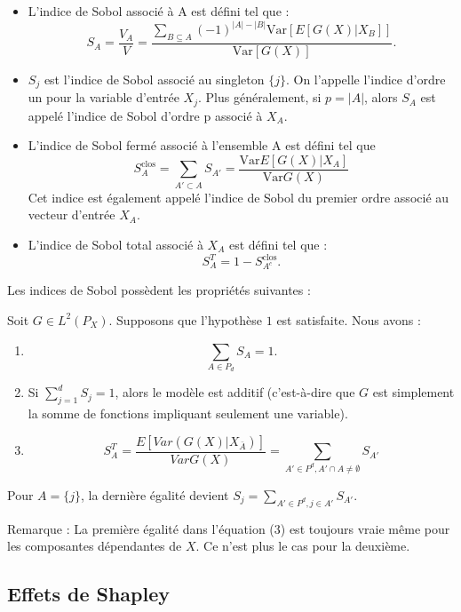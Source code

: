 \documentclass[
]{article}
\begin{document}
\begin{itemize}
\item
  L'indice de Sobol associé à A est défini tel que : \[
  S_A = \frac{V_A}{V} = \frac{\sum_{B \subseteq A} (-1)^{|A| - |B|} \text{Var} \left[E[G(X) | X_B]\right]}{\text{Var} [G(X)]}.
  \]
\item
  \(S_j\) est l'indice de Sobol associé au singleton \(\{j\}\). On
  l'appelle l'indice d'ordre un pour la variable d'entrée \(X_j\). Plus
  généralement, si \(p = |A|\), alors \(S_A\) est appelé l'indice de
  Sobol d'ordre p associé à \(X_A\).
\item
  L'indice de Sobol fermé associé à l'ensemble A est défini tel que
  \[ S^{\text{clos}}_A = \sum_{A'\subset A}S_{A'}=\frac{\text{Var} E[G(X)|X_A]}{\text{Var} G(X)} \]
  Cet indice est également appelé l'indice de Sobol du premier ordre
  associé au vecteur d'entrée \(X_A\).
\item
  L'indice de Sobol total associé à \(X_A\) est défini tel que : \[
  S^{T}_A = 1 - S^{\text{clos}}_{A^c}.
  \]
\end{itemize}

Les indices de Sobol possèdent les propriétés suivantes :

Soit \(G \in L^2(P_X)\). Supposons que l'hypothèse \(1\) est satisfaite.
Nous avons :

\begin{enumerate}
\def\labelenumi{\arabic{enumi}.}
\item
  \[
  \sum_{A \in P_d} S_A = 1.
  \]
\item
  Si \(\sum_{j=1}^d S_j = 1\), alors le modèle est additif (c'est-à-dire
  que \(G\) est simplement la somme de fonctions impliquant seulement
  une variable).
\item
  \[
  S_{A}^T = \frac{E [ Var (G(X)|X_{\bar{A}}) ]}{Var G(X)} =\sum_{A' \in P^d, A' \cap A \neq \emptyset} S_{A'}\tag{3}
  \]
\end{enumerate}

Pour \(A = \{j\}\), la dernière égalité devient
\(S_j = \sum_{A' \in P^d, j \in A'} S_{A'}\).

Remarque : La première égalité dans l'équation (3) est toujours vraie
même pour les composantes dépendantes de \(X\). Ce n'est plus le cas
pour la deuxième.

\hypertarget{effets-de-shapley}{%
\subsection{Effets de Shapley}\label{effets-de-shapley}}
\end{document}
